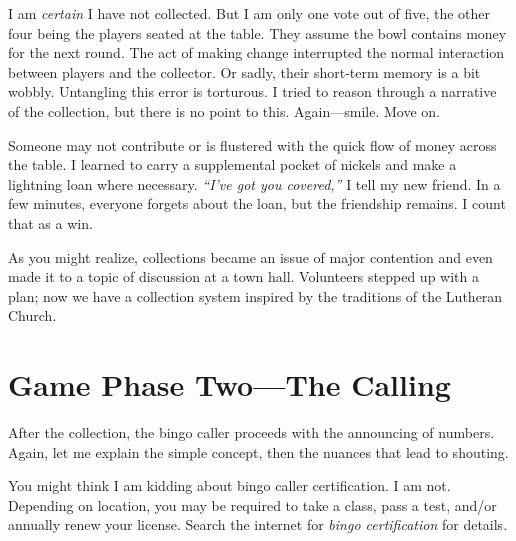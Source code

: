 \documentclass[
  letterpaper,
  DIV=11,
  numbers=noendperiod]{scrreprt}
\begin{document}
I am \emph{certain} I have not collected. But I am only one vote out of
five, the other four being the players seated at the table. They assume
the bowl contains money for the next round. The act of making change
interrupted the normal interaction between players and the collector. Or
sadly, their short-term memory is a bit wobbly. Untangling this error is
torturous. I tried to reason through a narrative of the collection, but
there is no point to this. Again---smile. Move on.

Someone may not contribute or is flustered with the quick flow of money
across the table. I learned to carry a supplemental pocket of nickels
and make a lightning loan where necessary. \emph{``I've got you
covered,''} I tell my new friend. In a few minutes, everyone forgets
about the loan, but the friendship remains. I count that as a win.

As you might realize, collections became an issue of major contention
and even made it to a topic of discussion at a town hall. Volunteers
stepped up with a plan; now we have a collection system inspired by the
traditions of the Lutheran Church.

\section*{Game Phase Two---The Calling}\label{game-phase-twothe-calling}


After the collection, the bingo caller proceeds with the announcing of
numbers. Again, let me explain the simple concept, then the nuances that
lead to shouting.

\begin{tcolorbox}[enhanced jigsaw, left=2mm, colbacktitle=quarto-callout-note-color!10!white, arc=.35mm, titlerule=0mm, leftrule=.75mm, colframe=quarto-callout-note-color-frame, breakable, toprule=.15mm, coltitle=black, rightrule=.15mm, opacityback=0, toptitle=1mm, opacitybacktitle=0.6, bottomtitle=1mm, title={Bingo Caller Certification}, colback=white, bottomrule=.15mm]

You might think I am kidding about bingo caller certification. I am not.
Depending on location, you may be required to take a class, pass a test,
and/or annually renew your license. Search the internet for \emph{bingo
certification} for details.

\end{tcolorbox}
\end{document}
